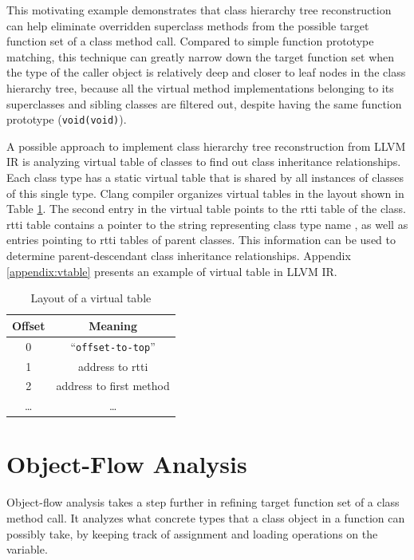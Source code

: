 This motivating example demonstrates that class hierarchy tree reconstruction can help eliminate overridden superclass methods from the possible target function set of a class method call. Compared to simple function prototype matching, this technique can greatly narrow down the target function set when the type of the caller object is relatively deep and closer to leaf nodes in the class hierarchy tree, because all the virtual method implementations belonging to its superclasses and sibling classes are filtered out, despite having the same function prototype (\texttt{void(void)}).

A possible approach to implement class hierarchy tree reconstruction from LLVM IR is analyzing virtual table of classes to find out class inheritance relationships. Each class type has a static virtual table that is shared by all instances of classes of this single type. Clang compiler organizes virtual tables in the layout \cite{type-metadata} \cite{vtable} shown in Table \ref{tab:vtable-layout}. The second entry in the virtual table points to the \ac{rtti} table of the class. \ac{rtti} table contains a pointer to the string representing class type name \cite{vtable}, as well as entries pointing to \ac{rtti} tables of parent classes. This information can be used to determine parent-descendant class inheritance relationships. Appendix \ref{appendix:vtable} presents an example of virtual table in LLVM IR.

\begin{table}[H]
    \centering
    \begin{tabular}{|c|c|}
        \hline
         Offset & Meaning \\
        \hline \hline
         0 & ``\texttt{offset-to-top}'' \\
        \hline
         1 & address to \acs{rtti} \\
        \hline
         2 & address to first method \\
        \hline
         \dots & \dots \\
        \hline
    \end{tabular}
    \caption{Layout of a virtual table}
    \label{tab:vtable-layout}
\end{table}

\section{Object-Flow Analysis}
\label{section:object-flow}

Object-flow analysis takes a step further in refining target function set of a class method call. It analyzes what concrete types that a class object in a function can possibly take, by keeping track of assignment and loading operations on the variable.

